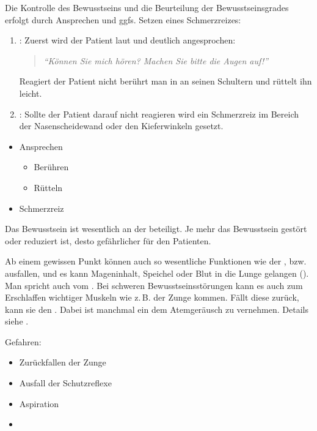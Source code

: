 {%
Die Kontrolle des Bewusstseins und die Beurteilung der 
Bewusstseinsgrades erfolgt durch Ansprechen und ggfs. Setzen eines 
Schmerzreizes: 
\begin{enumerate}
  \item {}: Zuerst wird der Patient laut und 
  deutlich angesprochen:  
  \begin{quote}
     \emph{\enquote{Können Sie mich hören? Machen Sie bitte die Augen
     auf!}}
  \end{quote}
  Reagiert der Patient nicht berührt man in an seinen Schultern und 
  rüttelt ihn leicht.  
  \item {}: Sollte der Patient darauf nicht 
  reagieren wird ein Schmerzreiz im Bereich der Nasenscheidewand oder 
  den Kieferwinkeln gesetzt. 
\end{enumerate}
}{%
\begin{itemize}
  \item Ansprechen
  \begin{itemize}
    \item Berühren
    \item Rütteln
  \end{itemize}
  \item Schmerzreiz 
\end{itemize}
}{}{}{}

{%
\label{topic:bewusstseinsstoerung-pam}%
Das Bewusstsein ist wesentlich an
der  beteiligt. Je mehr das
Bewusstsein gestört oder reduziert ist, desto gefährlicher für
den Patienten. 

Ab einem gewissen Punkt können auch so wesentliche
Funktionen wie der ,  bzw. 
ausfallen, und es kann Mageninhalt, Speichel oder Blut in
die Lunge gelangen (). Man spricht auch vom
.
Bei schweren Bewusstseinsstörungen kann es auch zum Erschlaffen
wichtiger Muskeln wie z.\,B. der Zunge kommen. Fällt
diese zurück, kann sie den .
Dabei ist manchmal ein dem 
Atemgeräusch zu vernehmen.
Details siehe .
}{%
Gefahren:
\begin{itemize}
  \item Zurückfallen der Zunge
  \item Ausfall der Schutzreflexe
  \item Aspiration
  \item {}
\end{itemize}
}{}{}{}

